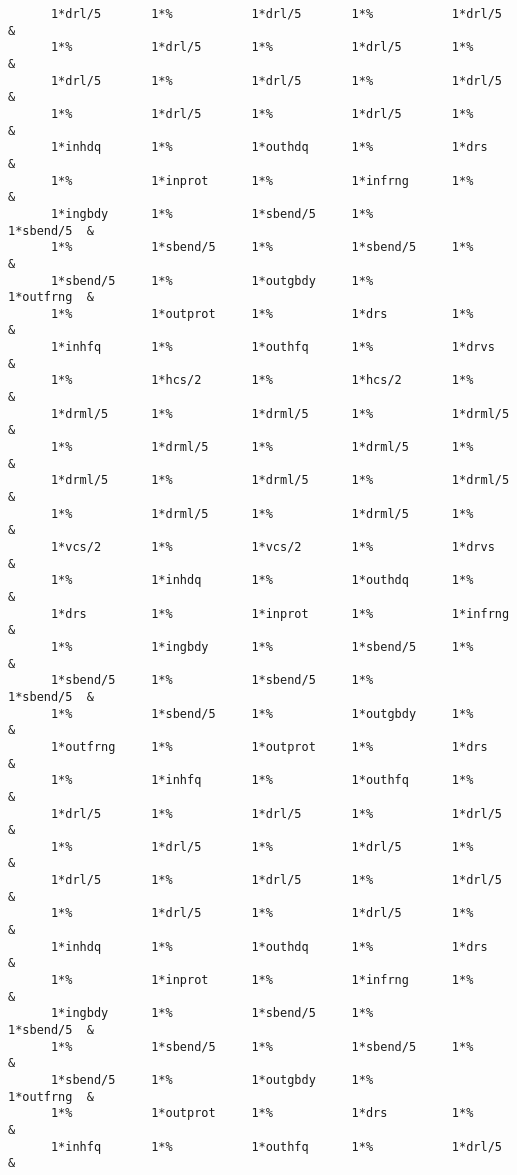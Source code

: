 \begin{footnotesize}
\begin{verbatim}
      1*drl/5       1*%           1*drl/5       1*%           1*drl/5    &
      1*%           1*drl/5       1*%           1*drl/5       1*%        &
      1*drl/5       1*%           1*drl/5       1*%           1*drl/5    &
      1*%           1*drl/5       1*%           1*drl/5       1*%        &
      1*inhdq       1*%           1*outhdq      1*%           1*drs      &
      1*%           1*inprot      1*%           1*infrng      1*%        &
      1*ingbdy      1*%           1*sbend/5     1*%           1*sbend/5  &
      1*%           1*sbend/5     1*%           1*sbend/5     1*%        &
      1*sbend/5     1*%           1*outgbdy     1*%           1*outfrng  &
      1*%           1*outprot     1*%           1*drs         1*%        &
      1*inhfq       1*%           1*outhfq      1*%           1*drvs     &
      1*%           1*hcs/2       1*%           1*hcs/2       1*%        &
      1*drml/5      1*%           1*drml/5      1*%           1*drml/5   &
      1*%           1*drml/5      1*%           1*drml/5      1*%        &
      1*drml/5      1*%           1*drml/5      1*%           1*drml/5   &
      1*%           1*drml/5      1*%           1*drml/5      1*%        &
      1*vcs/2       1*%           1*vcs/2       1*%           1*drvs     &
      1*%           1*inhdq       1*%           1*outhdq      1*%        &
      1*drs         1*%           1*inprot      1*%           1*infrng   &
      1*%           1*ingbdy      1*%           1*sbend/5     1*%        &
      1*sbend/5     1*%           1*sbend/5     1*%           1*sbend/5  &
      1*%           1*sbend/5     1*%           1*outgbdy     1*%        &
      1*outfrng     1*%           1*outprot     1*%           1*drs      &
      1*%           1*inhfq       1*%           1*outhfq      1*%        &
      1*drl/5       1*%           1*drl/5       1*%           1*drl/5    &
      1*%           1*drl/5       1*%           1*drl/5       1*%        &
      1*drl/5       1*%           1*drl/5       1*%           1*drl/5    &
      1*%           1*drl/5       1*%           1*drl/5       1*%        &
      1*inhdq       1*%           1*outhdq      1*%           1*drs      &
      1*%           1*inprot      1*%           1*infrng      1*%        &
      1*ingbdy      1*%           1*sbend/5     1*%           1*sbend/5  &
      1*%           1*sbend/5     1*%           1*sbend/5     1*%        &
      1*sbend/5     1*%           1*outgbdy     1*%           1*outfrng  &
      1*%           1*outprot     1*%           1*drs         1*%        &
      1*inhfq       1*%           1*outhfq      1*%           1*drl/5    &

\end{verbatim}
\end{footnotesize}
